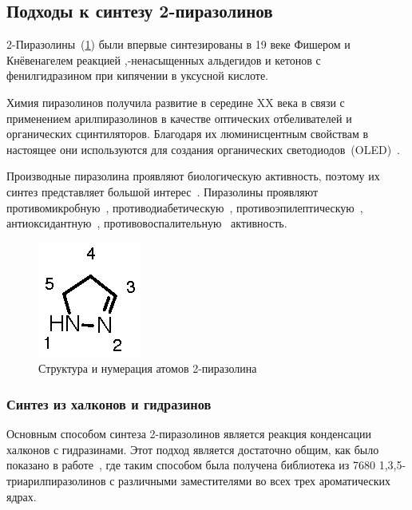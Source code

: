 \subsection{Подходы к синтезу 2-пиразолинов}
2-Пиразолины~(\ref{fig:pyrazoline_structure}) были впервые синтезированы в 19 веке Фишером и Кнёвенагелем реакцией \chemalpha,\chembeta-ненасыщенных альдегидов и кетонов с фенилгидразином при кипячении в уксусной кислоте.

Химия пиразолинов получила развитие в середине XX века в связи с применением арилпиразолинов в качестве оптических отбеливателей и органических сцинтиляторов.
Благодаря их люминисцентным свойствам в настоящее они используются для создания органических светодиодов~(OLED)~\cite{Stakhira2012,Ramkumar2015,Vandana2016}.

Производные пиразолина проявляют биологическую активность, поэтому их синтез представляет большой интерес~\cite{Salian2018, Singh2018,Korablina2016}.
Пиразолины проявляют противомикробную~\cite{Hassan2013}, противодиабетическую~\cite{Ahn2004}, противоэпилептическую~\cite{GunizKucukguzel2000}, антиоксидантную~\cite{Jagadish2013}, противовоспалительную~\cite{Barsoum2006} активность.

\begin{figure}
    \centering
    \includegraphics{sections/literature/img/pyrazoline_structure.eps}
    \caption{Структура и нумерация атомов 2-пиразолина}
    \label{fig:pyrazoline_structure}
\end{figure}

\subsubsection{Синтез из халконов и гидразинов}

Основным способом синтеза 2-пиразолинов является реакция конденсации халконов с гидразинами.
Этот подход является достаточно общим, как было показано в работе~\cite{Powers1998}, где таким способом была получена библиотека из \num{7680} 1,3,5-триарилпиразолинов с различными заместителями во всех трех ароматических ядрах.

